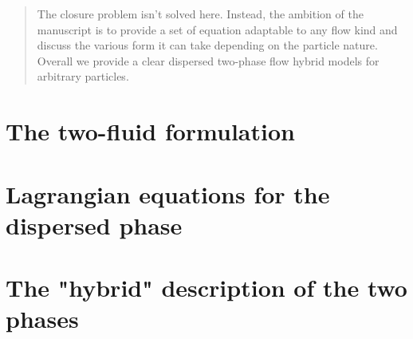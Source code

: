 \documentclass[11pt]{My_preprint}
\begin{document}
\begin{abstract}
    The closure problem isn't solved here. 
    Instead, the ambition of the manuscript is to provide a set of equation adaptable to any flow kind and discuss the various form it can take depending on the particle nature. 
    Overall we provide a clear dispersed two-phase flow hybrid models for arbitrary particles. 
\end{abstract}





\section{The two-fluid formulation}
\label{sec:two-fluid}



\section{Lagrangian equations for the dispersed phase}
\label{sec:Lagrangian}



\section{The "hybrid" description of the two phases}
\label{sec:averaged_eq}


% 


%
%
%
%
%
\end{document}
